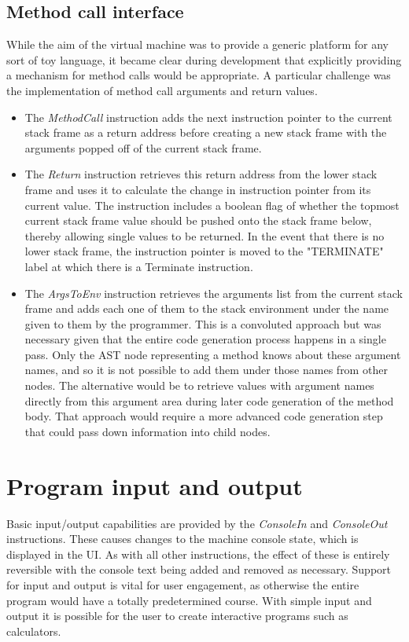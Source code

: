 \subsection{Method call interface}

While the aim of the virtual machine was to provide a generic platform for any sort of toy language, it became clear during development that explicitly providing a mechanism for method calls would be appropriate. A particular challenge was the implementation of method call arguments and return values.

\begin{itemize}
\item The \textit{MethodCall} instruction adds the next instruction pointer to the current stack frame as a return address before creating a new stack frame with the arguments popped off of the current stack frame.
\item The \textit{Return} instruction retrieves this return address from the lower stack frame and uses it to calculate the change in instruction pointer from its current value. The instruction includes a boolean flag of whether the topmost current stack frame value should be pushed onto the stack frame below, thereby allowing single values to be returned. In the event that there is no lower stack frame, the instruction pointer is moved to the "TERMINATE" label at which there is a Terminate instruction.
\item The \textit{ArgsToEnv} instruction retrieves the arguments list from the current stack frame and adds each one of them to the stack environment under the name given to them by the programmer. This is a convoluted approach but was necessary given that the entire code generation process happens in a single pass. Only the AST node representing a method knows about these argument names, and so it is not possible to add them under those names from other nodes. The alternative would be to retrieve values with argument names directly from this argument area during later code generation of the method body. That approach would require a more advanced code generation step that could pass down information into child nodes.
\end{itemize}

\section{Program input and output}

Basic input/output capabilities are provided by the \textit{ConsoleIn} and \textit{ConsoleOut} instructions. These causes changes to the machine console state, which is displayed in the UI. As with all other instructions, the effect of these is entirely reversible with the console text being added and removed as necessary. Support for input and output is vital for user engagement, as otherwise the entire program would have a totally predetermined course. With simple input and output it is possible for the user to create interactive programs such as calculators.

